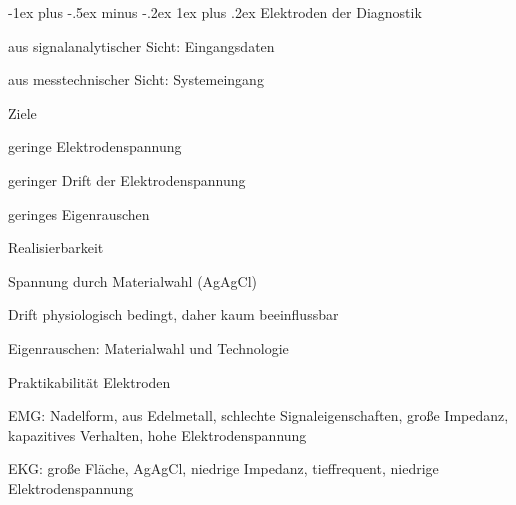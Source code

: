 \documentclass[a4paper]{article}
\makeatletter
\renewcommand{\subsubsection}{\@startsection{subsubsection}{3}{0mm}%
 {-1ex plus -.5ex minus -.2ex}%
 {1ex plus .2ex}%
 {\normalfont\small\bfseries}}
\makeatother
\begin{document}
\begin{multicols}{3}
  \subsubsection{Elektroden der Diagnostik}\label{elektroden-der-diagnostik}
  \begin{itemize*}
    \item aus signalanalytischer Sicht: Eingangsdaten
    \item aus messtechnischer Sicht: Systemeingang
  \end{itemize*}
  Ziele
  \begin{itemize*}
    \item geringe Elektrodenspannung
    \item geringer Drift der Elektrodenspannung
    \item geringes Eigenrauschen
  \end{itemize*}
  Realisierbarkeit
  \begin{itemize*}
    \item Spannung durch Materialwahl (AgAgCl)
    \item Drift physiologisch bedingt, daher kaum beeinflussbar
    \item Eigenrauschen: Materialwahl und Technologie
  \end{itemize*}
  Praktikabilität Elektroden
  \begin{itemize*}
    \item EMG: Nadelform, aus Edelmetall, schlechte Signaleigenschaften, große Impedanz, kapazitives Verhalten, hohe Elektrodenspannung
    \item EKG: große Fläche, AgAgCl, niedrige Impedanz, tieffrequent, niedrige Elektrodenspannung
  \end{itemize*}


\end{multicols}
\end{document}
